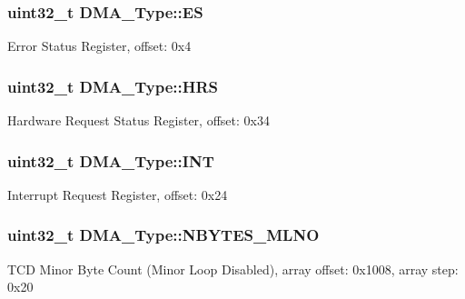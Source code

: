 \subsubsection[{\texorpdfstring{ES}{ES}}]{ uint32\+\_\+t D\+M\+A\+\_\+\+Type\+::\+ES}\hypertarget{structDMA__Type_abaffcb82be7f60e866d66565340dc515}{}\label{structDMA__Type_abaffcb82be7f60e866d66565340dc515}
Error Status Register, offset\+: 0x4 
\subsubsection[{\texorpdfstring{H\+RS}{HRS}}]{ uint32\+\_\+t D\+M\+A\+\_\+\+Type\+::\+H\+RS}\hypertarget{structDMA__Type_a597d98ef47d0b50b604f6afccc3c28dd}{}\label{structDMA__Type_a597d98ef47d0b50b604f6afccc3c28dd}
Hardware Request Status Register, offset\+: 0x34 
\subsubsection[{\texorpdfstring{I\+NT}{INT}}]{ uint32\+\_\+t D\+M\+A\+\_\+\+Type\+::\+I\+NT}\hypertarget{structDMA__Type_afad526bde6762b30554725cead19dec2}{}\label{structDMA__Type_afad526bde6762b30554725cead19dec2}
Interrupt Request Register, offset\+: 0x24 
\subsubsection[{\texorpdfstring{N\+B\+Y\+T\+E\+S\+\_\+\+M\+L\+NO}{NBYTES_MLNO}}]{ uint32\+\_\+t D\+M\+A\+\_\+\+Type\+::\+N\+B\+Y\+T\+E\+S\+\_\+\+M\+L\+NO}\hypertarget{structDMA__Type_a9babcf104a9abd52166f6a40054d3b08}{}\label{structDMA__Type_a9babcf104a9abd52166f6a40054d3b08}
T\+CD Minor Byte Count (Minor Loop Disabled), array offset\+: 0x1008, array step\+: 0x20 

